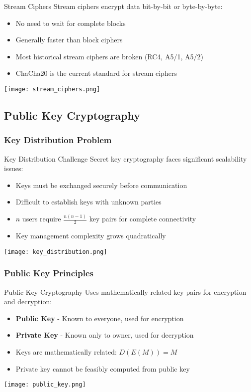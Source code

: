 \begin{concept}{Stream Ciphers}
    Stream ciphers encrypt data bit-by-bit or byte-by-byte:
    \begin{itemize}
        \item No need to wait for complete blocks
        \item Generally faster than block ciphers
        \item Most historical stream ciphers are broken (RC4, A5/1, A5/2)
        \item ChaCha20 is the current standard for stream ciphers
    \end{itemize}
    \texttt{[image: stream\_ciphers.png]}
\end{concept}

\subsection{Public Key Cryptography}

\subsubsection{Key Distribution Problem}

\begin{concept}{Key Distribution Challenge}
    Secret key cryptography faces significant scalability issues:
    \begin{itemize}
        \item Keys must be exchanged securely before communication
        \item Difficult to establish keys with unknown parties
        \item $n$ users require $\frac{n(n-1)}{2}$ key pairs for complete connectivity
        \item Key management complexity grows quadratically
    \end{itemize}
    \texttt{[image: key\_distribution.png]}
\end{concept}

\subsubsection{Public Key Principles}

\begin{definition}{Public Key Cryptography}
    Uses mathematically related key pairs for encryption and decryption:
    \begin{itemize}
        \item \textbf{Public Key} - Known to everyone, used for encryption
        \item \textbf{Private Key} - Known only to owner, used for decryption
        \item Keys are mathematically related: $D(E(M)) = M$
        \item Private key cannot be feasibly computed from public key
    \end{itemize}
    \texttt{[image: public\_key.png]}
\end{definition}

